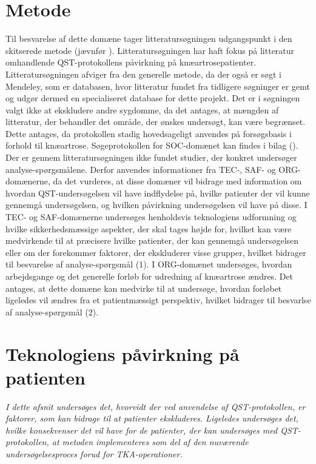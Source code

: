 \section{Metode}
Til besvarelse af dette domæne tager litteratursøgningen udgangspunkt i den skitserede metode (jævnfør ). Litteratursøgningen har haft fokus på litteratur omhandlende QST-protokollens påvirkning på knæartrosepatienter. Litteratursøgningen afviger fra den generelle metode, da der også er søgt i Mendeley, som er databasen, hvor litteratur fundet fra tidligere søgninger er gemt og udgør dermed en specialiseret database for dette projekt. Det er i søgningen valgt ikke at ekskludere andre sygdomme, da det antages, at mængden af litteratur, der behandler det område, der ønskes undersøgt, kan være begrænset. Dette antages, da protokollen stadig hovedsageligt anvendes på forsøgsbasis i forhold til knæartrose. Søgeprotokollen for SOC-domænet kan findes i bilag (). \\
Der er gennem litteratursøgningen ikke fundet studier, der konkret undersøger analyse-spørgsmålene. Derfor anvendes informationer fra TEC-, SAF- og ORG-domænerne, da det vurderes, at disse domæner vil bidrage med information om hvordan QST-undersøgelsen vil have indflydelse på, hvilke patienter der vil kunne gennemgå undersøgelsen, og hvilken påvirkning undersøgelsen vil have på disse. I TEC- og SAF-domænerne undersøges henholdsvis teknologiens udformning og hvilke sikkerhedsmæssige aspekter, der skal tages højde for, hvilket kan være medvirkende til at præcisere hvilke patienter, der kan gennemgå undersøgelsen eller om der forekommer faktorer, der ekskluderer visse grupper, hvilket bidrager til besvarelse af analyse-spørgsmål (1). I ORG-domænet undersøges, hvordan arbejdsgange og det generelle forløb for udredning af knæartrose ændres. Det antages, at dette domæne kan medvirke til at undersøge, hvordan forløbet ligeledes vil ændres fra et patientmæssigt perspektiv, hvilket bidrager til besvarlse af analyse-spørgsmål (2). 
 
\section{Teknologiens påvirkning på patienten}
\textit{I dette afsnit undersøges det, hvorvidt der ved anvendelse af QST-protokollen, er faktorer, som kan bidrage til at patienter ekskluderes. Ligeledes undersøges det, hvilke konsekvenser det vil have for de patienter, der kan undersøges med QST-protokollen, at metoden implementeres som del af den nuværende undersøgelsesproces forud for TKA-operationer.}

